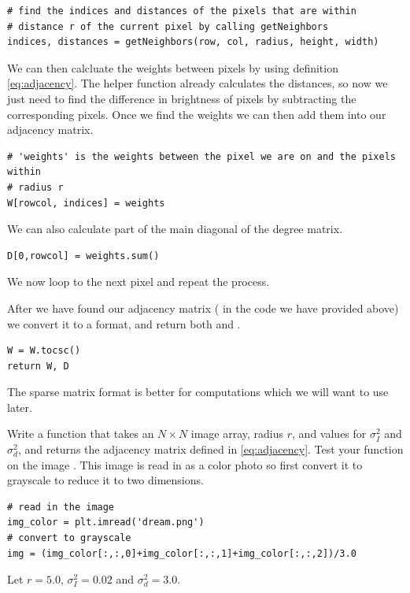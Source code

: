 \begin{lstlisting}
# find the indices and distances of the pixels that are within 
# distance r of the current pixel by calling getNeighbors
indices, distances = getNeighbors(row, col, radius, height, width)
\end{lstlisting}
We can then calcluate the weights between pixels by using definition \eqref{eq:adjacency}. The helper function already calculates the distances, so now we just need to find the difference in brightness of pixels by subtracting the corresponding pixels.
Once we find the weights we can then add them into our adjacency matrix. 
\begin{lstlisting}
# 'weights' is the weights between the pixel we are on and the pixels within
# radius r
W[rowcol, indices] = weights
\end{lstlisting}
We can also calculate part of the main diagonal of the degree matrix.
\begin{lstlisting}
D[0,rowcol] = weights.sum()
\end{lstlisting}
We now loop to the next pixel and repeat the process.

After we have found our adjacency matrix ( in the code we have provided above) we convert it to a  format, and return both  and . 
\begin{lstlisting}
W = W.tocsc()
return W, D
\end{lstlisting}
The sparse matrix format  is better for computations which we will want to use later.




\begin{problem}
Write a function  that takes an $N \times N$ image array, radius $r$, and values for
$\sigma_I^2$ and $\sigma_d^2$, and returns the adjacency matrix defined in \eqref{eq:adjacency}. Test your function on the image . This image is read in as a color photo so first convert it to grayscale to reduce it to two dimensions.
\begin{lstlisting}
# read in the image
img_color = plt.imread('dream.png')
# convert to grayscale
img = (img_color[:,:,0]+img_color[:,:,1]+img_color[:,:,2])/3.0
\end{lstlisting}
Let $r=5.0$, $\sigma_I^2=0.02$ and $\sigma_d^2=3.0$.


\label{prob4}
\end{problem}

